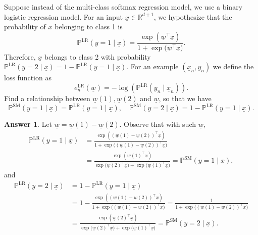 \documentclass{article}
\newcommand{\probP}{\mathds{P}}
\theoremstyle{definition}
\newtheorem*{answer}{Answer}
\begin{document}
\begin{question}[start=0]
\begin{question}
		\item \label{SMtoLR}Suppose instead of the multi-class softmax regression model, we use a binary logistic regression model. For an input $\underline{x} \in \mathbb{R}^{d+1}$, we hypothesize that the probability of $x$ belonging to class 1 is
		\[
		\probP^{\text{LR}}(y = 1\mid \underline{x}) = \frac{\exp({\underline{w}^\top \underline{x}})}{1 + \exp{(\underline{w}^\top \underline{x}})}.
		\]
		Therefore, $\underline{x}$ belongs to class 2 with probability $\probP^{\text{LR}}(y = 2\mid \underline{x}) = 1 - \probP^{\text{LR}}(y = 1\mid \underline{x})$. For an example $(\underline{x}_n, y_n)$ we define the loss function as
		\[
		e^{\text{LR}}_{n}(\underline{w}) = -\log(\probP^{\text{LR}}(y_n\mid \underline{x}_n)).
		\]
		Find a relationship between $\underline{w}(1), \underline{w}(2)$ and $\underline{w}$, so that we have
		\[
		\probP^{\text{SM}}(y = 1\mid \underline{x}) = \probP^{\text{LR}}(y = 1\mid \underline{x}), \quad \probP^{\text{SM}}(y = 2\mid \underline{x}) = 1 - \probP^{\text{LR}}(y = 1\mid \underline{x}).
		\]
		\begin{answer}
			Let $\underline{w} = \underline{w}(1) - \underline{w}(2)$. Observe that with such $\underline{w}$,
			\begin{align*}
				\probP^{\text{LR}}(y = 1\mid \underline{x}) &= \frac{\exp({\left(\underline{w}(1) - \underline{w}(2)\right)^\top \underline{x}})}{1 + \exp{(\left(\underline{w}(1) - \underline{w}(2)\right)^\top \underline{x}})}\\
				&= \frac{\exp({\underline{w}(1)^\top \underline{x}})}{\exp{(\underline{w}(2)^\top \underline{x}}) + \exp{(\underline{w}(1)^\top \underline{x}})} = \probP^{\text{SM}}(y = 1\mid \underline{x}),
			\end{align*}
			and 
			\begin{align*}
				\probP^{\text{LR}}(y = 2\mid \underline{x}) &= 1- \probP^{\text{LR}}(y = 1\mid \underline{x})\\
				 &= 1 - \frac{\exp({\left(\underline{w}(1) - \underline{w}(2)\right)^\top \underline{x}})}{1 + \exp{(\left(\underline{w}(1) - \underline{w}(2)\right)^\top \underline{x}})} = \frac{1}{1 + \exp{(\left(\underline{w}(1) - \underline{w}(2)\right)^\top \underline{x}})}\\
				&= \frac{\exp({\underline{w}(2)^\top \underline{x}})}{\exp{(\underline{w}(2)^\top \underline{x}}) + \exp{(\underline{w}(1)^\top \underline{x}})} = \probP^{\text{SM}}(y = 2\mid \underline{x}).
			\end{align*}
		\end{answer}

\end{question}
\end{question}
\end{document}
